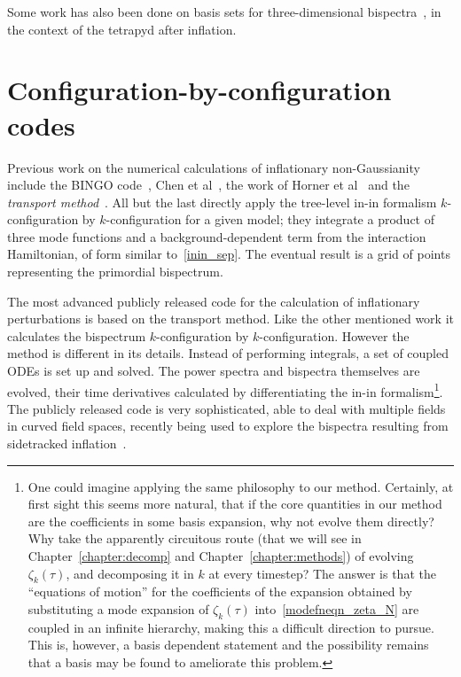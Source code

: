 Some work has also been done on basis sets for three-dimensional
bispectra~\cite{Byun_1, Byun_2, modal_battefeld}, in the context
of the tetrapyd after inflation.


    \section{Configuration-by-configuration codes}
    Previous work on the numerical calculations of inflationary
non-Gaussianity include the BINGO code~\cite{BINGO},
Chen et al~\cite{chen_easther_lim_1,chen_easther_lim_2},
the work of Horner et al~\cite{horner_methods,horner_ng,horner_cs}
and the \textit{transport method}~\cite{transport_main,transport_pytransport,transport_pytransport_2,transport_curved_3_point}.
All but the last directly apply the tree-level in-in formalism $k$-configuration by $k$-configuration for a given model;
they integrate a product of three mode functions and a background-dependent term from the interaction Hamiltonian, of form similar to~\eqref{inin_sep}.
The eventual result is a grid of points representing the primordial bispectrum.


The most advanced publicly released code for the calculation of inflationary perturbations
is based on the transport method.
Like the other mentioned work it calculates the bispectrum $k$-configuration by $k$-configuration.
However the method is different in its details.
Instead of performing integrals,
a set of coupled ODEs is set up and solved.
The power spectra and bispectra themselves are evolved, their time derivatives calculated by
differentiating the in-in formalism\footnote{
    One could imagine applying the same philosophy to our method.
    Certainly, at first sight this seems more natural, that if the core
    quantities in our method are the coefficients in some basis expansion,
    why not evolve them directly? Why take the apparently circuitous route
    (that we will see in Chapter~\ref{chapter:decomp} and Chapter~\ref{chapter:methods})
    of evolving $\zeta_k(\tau)$, and decomposing it in $k$ at every timestep?
    The answer is that the ``equations of motion'' for the coefficients of the expansion
    obtained by substituting a mode expansion of $\zeta_k(\tau)$ into~\eqref{modefneqn_zeta_N}
    are coupled in an infinite hierarchy, making this a difficult
    direction to pursue. This is, however, a basis dependent statement
    and the possibility remains that a basis may be found to ameliorate this problem.
    }.
The publicly released code is very sophisticated,
able to deal with multiple fields in curved field spaces,
recently being used to explore the bispectra resulting from
sidetracked inflation~\cite{RP_1}.



